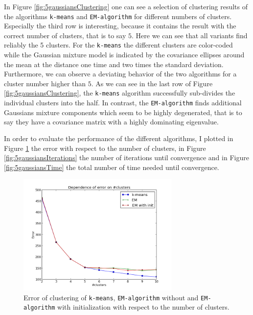 \documentclass[a4paper, 12pt, titlepage]{article}
\begin{document}
In Figure \ref{fig:5gaussiansClustering} one can see a selection of clustering results of the algorithms \texttt{k-means} and \texttt{EM-algorithm} for different numbers of clusters.
Especially the third row is interesting, because it contains the result with the correct number of clusters, that is to say $5$.
Here we can see that all variants find reliably the 5 clusters.
For the \texttt{k-means} the different clusters are color-coded while the Gaussian mixture model is indicated by the covariance ellipses around the mean at the distance one time and two times the standard deviation.
Furthermore, we can observe a deviating behavior of the two algorithms for a cluster number higher than $5$.
As we can see in the last row of Figure \ref{fig:5gaussiansClustering}, the \texttt{k-means} algorithm successfully sub-divides the individual clusters into the half.
In contrast, the \texttt{EM-algorithm} finds additional Gaussians mixture components which seem to be highly degenerated, that is to say they have a covariance matrix with a highly dominating eigenvalue.

In order to evaluate the performance of the different algorithms, I plotted in Figure \ref{fig:5gaussiansError} the error with respect to the number of clusters, in Figure \ref{fig:5gaussiansIterations} the number of iterations until convergence and in Figure \ref{fig:5gaussiansTime} the total number of time needed until convergence.

\begin{figure}
	\centering
	\includegraphics[width=8cm]{images/5gaussiansError.png}
	\caption{Error of clustering of \texttt{k-means}, \texttt{EM-algorithm} without and \texttt{EM-algorithm} with initialization with respect to the number of clusters.}
	\label{fig:5gaussiansError}
\end{figure}
\end{document}
